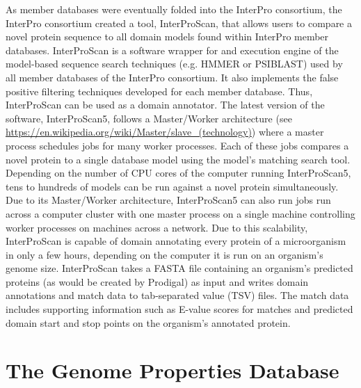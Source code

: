 As member databases were eventually folded into the InterPro consortium, the InterPro consortium created a tool, InterProScan, that allows users to compare a novel protein sequence to all domain models found within InterPro member databases. InterProScan is a software wrapper for and execution engine of the model-based sequence search techniques (e.g. HMMER or PSIBLAST) used by all member databases of the InterPro consortium. It also implements the false positive filtering techniques developed for each member database. Thus, InterProScan can be used as a domain annotator. The latest version of the software, InterProScan5, follows a Master/Worker architecture (see \href{https://en.wikipedia.org/wiki/Master/slave\_(technology)}{https://en.wikipedia.org/wiki/Master/slave\_(technology)}) where a master process schedules jobs for many worker processes. Each of these jobs compares a novel protein to a single database model using the model's matching search tool. Depending on the number of CPU cores of the computer running InterProScan5, tens to hundreds of models can be run against a novel protein simultaneously. Due to its Master/Worker architecture, InterProScan5 can also run jobs run across a computer cluster with one master process on a single machine controlling worker processes on machines across a network. Due to this scalability, InterProScan is capable of domain annotating every protein of a microorganism in only a few hours, depending on the computer it is run on an organism's genome size. InterProScan takes a FASTA file \cite{pearson19905} containing an organism's predicted proteins (as would be created by Prodigal) as input and writes domain annotations and match data to tab-separated value (TSV) files. The match data includes supporting information such as E-value scores for matches and predicted domain start and stop points on the organism's annotated protein.

\section{The Genome Properties Database} \label{genome-properties-overview}

